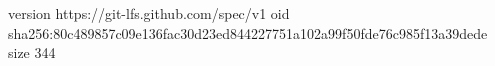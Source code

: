 version https://git-lfs.github.com/spec/v1
oid sha256:80c489857c09e136fac30d23ed844227751a102a99f50fde76c985f13a39dede
size 344

